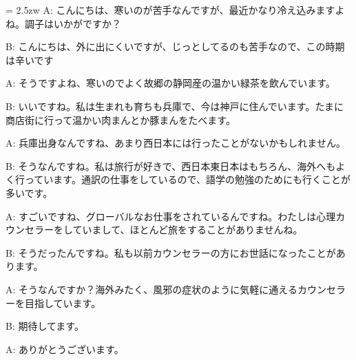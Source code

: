 \documentclass[11pt]{amsart}
\title{}
\author{}
\newenvironment{hangall}[1]{\hangindent = 2.5zw\everypar{\hangindent = 2.5zw}}{}
\begin{document}
\maketitle
\begin{hangall}{}%
A: こんにちは、寒いのが苦手なんですが、最近かなり冷え込みますよね。調子はいかがですか？



B: こんにちは、外に出にくいですが、じっとしてるのも苦手なので、この時期は辛いです



A: そうですよね、寒いのでよく故郷の静岡産の温かい緑茶を飲んでいます。



B: いいですね。私は生まれも育ちも兵庫で、今は神戸に住んでいます。たまに商店街に行って温かい肉まんとか豚まんをたべます。



A: 兵庫出身なんですね、あまり西日本には行ったことがないかもしれません。



B: そうなんですね。私は旅行が好きで、西日本東日本はもちろん、海外へもよく行っています。通訳の仕事をしているので、語学の勉強のためにも行くことが多いです。



A: すごいですね、グローバルなお仕事をされているんですね。わたしは心理カウンセラーをしていまして、ほとんど旅をすることがありませんね。



B: そうだったんですね。私も以前カウンセラーの方にお世話になったことがあります。



A: そうなんですか？海外みたく、風邪の症状のように気軽に通えるカウンセラーを目指しています。



B: 期待してます。



A: ありがとうございます。\end{hangall}
\end{document}
